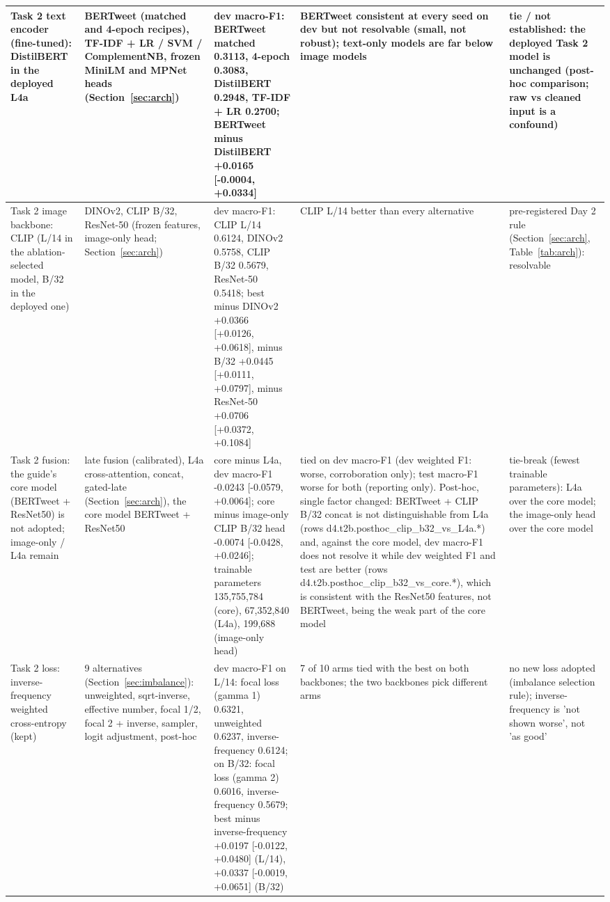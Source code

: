\documentclass[conference]{IEEEtran}
\begin{document}
\begin{table}[t]
\begin{tabular}{p{2.2cm}p{3.1cm}p{5.6cm}p{3.2cm}p{2.6cm}}
\midrule
Task 2 text encoder (fine-tuned): DistilBERT in the deployed L4a & BERTweet (matched and 4-epoch recipes), TF-IDF + LR / SVM / ComplementNB, frozen MiniLM and MPNet heads (Section~\ref{sec:arch}) & dev macro-F1: BERTweet matched 0.3113, 4-epoch 0.3083, DistilBERT 0.2948, TF-IDF + LR 0.2700; BERTweet minus DistilBERT +0.0165 [-0.0004, +0.0334] & BERTweet consistent at every seed on dev but not resolvable (small, not robust); text-only models are far below image models & tie / not established: the deployed Task 2 model is unchanged (post-hoc comparison; raw vs cleaned input is a confound) \\
\midrule
Task 2 image backbone: CLIP (L/14 in the ablation-selected model, B/32 in the deployed one) & DINOv2, CLIP B/32, ResNet-50 (frozen features, image-only head; Section~\ref{sec:arch}) & dev macro-F1: CLIP L/14 0.6124, DINOv2 0.5758, CLIP B/32 0.5679, ResNet-50 0.5418; best minus DINOv2 +0.0366 [+0.0126, +0.0618], minus B/32 +0.0445 [+0.0111, +0.0797], minus ResNet-50 +0.0706 [+0.0372, +0.1084] & CLIP L/14 better than every alternative & pre-registered Day 2 rule (Section~\ref{sec:arch}, Table~\ref{tab:arch}): resolvable \\
\midrule
Task 2 fusion: the guide's core model (BERTweet + ResNet50) is not adopted; image-only / L4a remain & late fusion (calibrated), L4a cross-attention, concat, gated-late (Section~\ref{sec:arch}), the core model BERTweet + ResNet50 & core minus L4a, dev macro-F1 -0.0243 [-0.0579, +0.0064]; core minus image-only CLIP B/32 head -0.0074 [-0.0428, +0.0246]; trainable parameters 135,755,784 (core), 67,352,840 (L4a), 199,688 (image-only head) & tied on dev macro-F1 (dev weighted F1: worse, corroboration only); test macro-F1 worse for both (reporting only). Post-hoc, single factor changed: BERTweet + CLIP B/32 concat is not distinguishable from L4a (rows d4.t2b.posthoc\_clip\_b32\_vs\_L4a.*) and, against the core model, dev macro-F1 does not resolve it while dev weighted F1 and test are better (rows d4.t2b.posthoc\_clip\_b32\_vs\_core.*), which is consistent with the ResNet50 features, not BERTweet, being the weak part of the core model & tie-break (fewest trainable parameters): L4a over the core model; the image-only head over the core model \\
\midrule
Task 2 loss: inverse-frequency weighted cross-entropy (kept) & 9 alternatives (Section~\ref{sec:imbalance}): unweighted, sqrt-inverse, effective number, focal 1/2, focal 2 + inverse, sampler, logit adjustment, post-hoc & dev macro-F1 on L/14: focal loss (gamma 1) 0.6321, unweighted 0.6237, inverse-frequency 0.6124; on B/32: focal loss (gamma 2) 0.6016, inverse-frequency 0.5679; best minus inverse-frequency +0.0197 [-0.0122, +0.0480] (L/14), +0.0337 [-0.0019, +0.0651] (B/32) & 7 of 10 arms tied with the best on both backbones; the two backbones pick different arms & no new loss adopted (imbalance selection rule); inverse-frequency is 'not shown worse', not 'as good' \\

\end{tabular}
\end{table}
\end{document}
